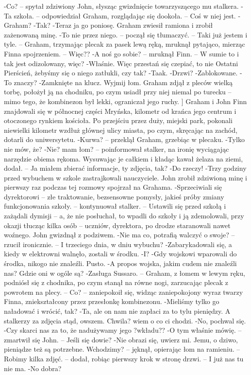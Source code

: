 \documentclass[../MAIN.tex]{subfiles}
\begin{document}
-Co? -- spytał zdziwiony John, słysząc gwizdnięcie towarzyszącego mu stalkera.
-Ta szkoła. -- odpowiedział Graham, rozglądając się dookoła. -- Coś w niej jest.
-Graham?
-Tak?
-Teraz ja go poniosę.
Graham zwiesił ramiona i zrobił zażenowaną minę.
-To nie przez niego. -- począł się tłumaczyć. -- Taki już jestem i tyle. -- Graham, trzymając plecak za pasek lewą ręką, mruknął pytająco, mierząc Finna spojrzeniem. -- Więc??
-A noś go sobie? -- mruknął Finn. -- W sumie to i tak jest odizolowany, więc?
-Właśnie. Więc przestań się czepiać, to nie Ostatni Pierścień, żebyśmy się o niego zatłukli, czy tak?
-Taak.
-Drzwi?
-Zablokowane.
-To znaczy?
-Zamknięte na klucz. Wyjmij łom.
Graham zdjął z pleców wielką torbę, położył ją na chodniku, po czym usiadł przy niej niemal po turecku -- mimo tego, że kombinezon był lekki, ograniczał jego ruchy. ]
Graham i John Finn znajdowali się w północnej części Mryńska, kilometr od krańca jego centrum i otoczonego rynkiem kościoła. Po przejściu przez duży, miejski park, pokonali niewielki kilometr wzdłuż głównej ulicy miasta, po czym, skręcając na zachód, dotarli do uniwersytetu.
-Kurwa? -- przeklął Graham, grzebiąc w plecaku.
-Tylko nie mów, że?
-Nie? mam łom? -- poinformował stalker, na ironię wyciągając narzędzie obiema rękoma. Wysuwając je całkiem i kładąc kawał żelaza na ziemi, dodał. -- Ja miałem zbierać informacje, ty zdjęcia, tak?
-Do rzeczy!
-Trzy godziny przed wybuchem w szkole zastrajkowali nauczyciele.
John zrobił zdziwioną minę i pierwszy raz podczas tej rozmowy spojrzał na Grahama.
-Sprzeciwiali się dyrektorowi -- złe traktowanie, bezsensowne pomysły, jakieś próby zmiany funkcjonowania szkoły. -- kontynuował stalker. -- Ustawili się przed szkołą i zażądali dymisji -- a, że nie posłuchał, to wpadli do szkoły i ją zdemolowali, przy okazji tłucząc kilka osób -- uczniów, dyrektora, po drodze staranowali nawet woźnego.
John gwizdnął z podziwem.
-Nie ma co, potrafią walczyć o swoje? -- rzucił ironicznie. -- I trzeciego dnia, w dniu wybuchu?
-Zabarykadowali się, a kiedy w elektrowni walnęło, zostali w środku.
-I?
-Gdy wojskowi wparowali do środka, nikogo nie znaleźli. Pusto.
-A propos wojska, jakim cudem nie znaleźli nas? Gdzie oni w ogóle są?
-Zasługa Sussaro. -- Graham, z łomem w lewym ręku, podniósł się z chodnika, po czym stanął na równe nogi, zarzucając plecak z powrotem na plecy. -- Co? -- zaniepokoił się, widząc zaniepokojony wyraz twarzy Finna, zniekształcony przez przesłonkę kombinezonu.
-Mieliśmy tylko go naładować i wrócić, tak?
-Ta, ale on nam nie zapłaci za to tylu pieniędzy. A stalkerzy za zdjęcia stąd, owszem. Chwila? wiem o co ci chodzi.
-No, pochwal się.
-Czy skarci nas za to, że nadużywamy jego ?wkładu??
-O tym właśnie mówię. -- zmartwił się John. -- Jeśli się dowie?
-Nie obrazi się, uwierz mi. Jemu, o dziwo, pieniądze też są potrzebne. Wchodzimy? -- jęknął, opierając łom na ramieniu. -- Robimy kilka zdjęć. -- dodał, robiąc pierwszy krok w stronę drzwi. -- I już nas tu nie ma.
-No dobra?
\end{document}
